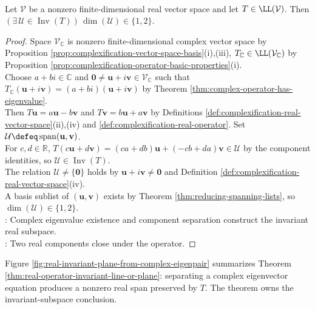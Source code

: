 \begin{theorem} \label{thm:real-operator-invariant-line-or-plane} \\
Let $\mathcal{V}$ be a nonzero finite-dimensional real vector space and let $T\in\LL(\mathcal{V})$. Then $(\exists\,\mathcal{U}\in\operatorname{Inv}(T))\,\dim(\mathcal{U})\in\{1,2\}$.
\begin{proof} Space $\mathcal{V}_{\mathbb{C}}$ is nonzero finite-dimensional complex vector space by Proposition \ref{prop:complexification-vector-space-basis}(i),(iii), $T_{\mathbb{C}}\in\LL(\mathcal{V}_{\mathbb{C}})$ by Proposition \ref{prop:complexification-operator-basic-properties}(i).\\
Choose $a+bi\in\mathbb{C}$ and $\mathbf{0}\neq\mathbf{u}+i\mathbf{v}\in\mathcal{V}_{\mathbb{C}}$ such that $T_{\mathbb{C}}(\mathbf{u}+i\mathbf{v})=(a+bi)(\mathbf{u}+i\mathbf{v})$ by Theorem \ref{thm:complex-operator-has-eigenvalue}.\\
Then $T\mathbf{u}=a\mathbf{u}-b\mathbf{v}$ and $T\mathbf{v}=b\mathbf{u}+a\mathbf{v}$ by Definitions \ref{def:complexification-real-vector-space}(ii),(iv) and \ref{def:complexification-real-operator}. Set $\mathcal{U}\defeq\operatorname{span}(\mathbf{u},\mathbf{v})$.\\
For $c,d\in\mathbb{R}$, $T(c\mathbf{u}+d\mathbf{v})=(ca+db)\mathbf{u}+(-cb+da)\mathbf{v}\in\mathcal{U}$ by the component identities, so $\mathcal{U}\in\operatorname{Inv}(T)$.\\
The relation $\mathcal{U}\neq\{\mathbf{0}\}$ holds by $\mathbf{u}+i\mathbf{v}\neq\mathbf{0}$ and Definition \ref{def:complexification-real-vector-space}(iv).\\
A basis sublist of $(\mathbf{u},\mathbf{v})$ exists by Theorem \ref{thm:reducing-spanning-lists}, so $\dim(\mathcal{U})\in\{1,2\}$.\\
: Complex eigenvalue existence and component separation construct the invariant real subspace.\\
: Two real components close under the operator.
\end{proof}
\end{theorem}

Figure \ref{fig:real-invariant-plane-from-complex-eigenpair} summarizes Theorem \ref{thm:real-operator-invariant-line-or-plane}: separating a complex eigenvector equation produces a nonzero real span preserved by $T$. The theorem owns the invariant-subspace conclusion.

